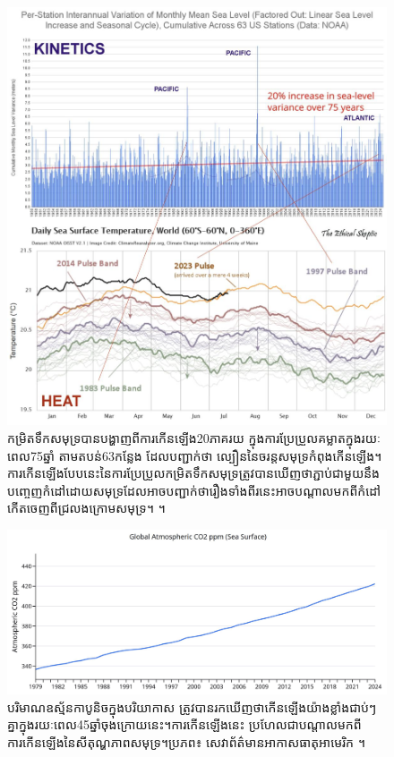 \documentclass[10pt,twocolumn,letterpaper]{article}
\begin{document}
\begin{figure}[t]
\begin{center}
\includegraphics[width=1\textwidth]{sealevel.jpeg}
\end{center}
   \caption{កម្រិតទឹកសមុទ្របានបង្ហាញពីការកើនឡើង20ភាគរយ ក្នុងការប្រែប្រួលគម្លាតក្នុងរយៈពេល75ឆ្នាំ តាមតបន់63កន្លែង ដែលបញ្ជាក់ថា ល្បឿននៃចរន្តសមុទ្រកំពុងកើនឡើង។ការកើនឡើងបែបនេះនៃការប្រែប្រួលកម្រិតទឹកសមុទ្រត្រូវបានឃើញថាភ្ជាប់ជាមួយនឹង បញ្ចេញកំដៅដោយសមុទ្រដែលអាចបញ្ជាក់ថារឿងទាំងពីរនេះអាចបណ្តាលមកពីកំដៅកើតចេញពីជ្រលងក្រោមសមុទ្រ។ \cite{2,129}។}
\label{fig:22}
\end{figure}

\begin{figure}[t]
\begin{center}
\includegraphics[width=1\textwidth]{co2.jpg}
\end{center}
   \caption{បរិមាណឧស្ម័នកាបូនិចក្នុងបរិយាកាស ត្រូវបានរកឃើញថាកើនឡើងយ៉ាងខ្លាំងជាប់ៗគ្នាក្នុងរយៈពេល45ឆ្នាំចុងក្រោយនេះ។ការកើនឡើងនេះ ប្រហែលជាបណ្តាលមកពីការកើនឡើងនៃសីតុណ្ហភាពសមុទ្រ។ប្រភព៖ សេវាព័ត៌មានអាកាសធាតុអាមេរិក \cite{148,129}។}
\label{fig:23}
\end{figure}
\end{document}
